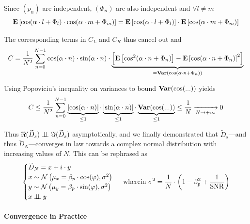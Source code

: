 Since $(p_n)$ are independent, $(\Phi_n)$ are also independent and $\forall l \neq m$
\begin{equation}
	\mathbf{E} \left[\cos(\alpha \cdot l + \Phi_l) \cdot \cos(\alpha \cdot m + \Phi_m) \right] = \mathbf{E} \left[\cos(\alpha \cdot l + \Phi_l)\right] \cdot \mathbf{E} \left[ \cos(\alpha \cdot m + \Phi_m) \right]
\end{equation}

The corresponding terms in $C_L$ and $C_R$ thus cancel out and
\begin{equation}
	\begin{aligned}
		C &= \frac{1}{N^2} \sum_{n=0}^{N-1} \cos (\alpha \cdot n) \cdot \sin (\alpha \cdot n) \cdot \underbrace{ \left[ \mathbf{E} \left[\cos^2 (\alpha \cdot n + \Phi_n)\right] - \mathbf{E} \left[\cos(\alpha \cdot n + \Phi_n)\right]^2 \right] }_{=\mathbf{Var} (\cos (\alpha \cdot n + \Phi_n))}\\
	\end{aligned}
\end{equation}

Using Popoviciu's inequality on variances to bound $\mathbf{Var} (\cos (...))$ yields
\begin{equation}
	C \leq \frac{1}{N^2} \sum_{n=0}^{N-1} \underbrace{\left|\cos (\alpha \cdot n)\right|}_{\leq 1} \cdot \underbrace{\left|\sin (\alpha \cdot n)\right|}_{\leq 1} \cdot \underbrace{\mathbf{Var} (\cos (...))}_{\leq 1} \leq \frac{1}{N} \xrightarrow[N \rightarrow + \infty]{} 0
\end{equation}

Thus $\Re(\widetilde{D}_s) \mathrel{\perp\!\!\!\perp} \Im(\widetilde{D}_s)$ asymptotically, and we finally demonstrated that $\widetilde{D}_s$---and thus $\widetilde{D}_N$---converges in law towards a complex normal distribution with increasing values of $N$. This can be rephrased as
\begin{equation}\label{eq:choos:apsipa:xy_tilde_def}
	\begin{cases}
		\widetilde{D}_N = x + i\cdot y \\
		x \sim \mathcal{N}\left(\mu_x = \beta_p \cdot \cos(\varphi), \sigma^2 \right)\\
		y \sim \mathcal{N}\left(\mu_y = \beta_p \cdot \sin(\varphi), \sigma^2 \right)\\
		x \mathrel{\perp\!\!\!\perp} y
	\end{cases}\text{ wherein } \sigma^2 = \frac{1}{N} \cdot \left(1 - \beta_p^2 + \frac{1}{\text{SNR}}\right)
\end{equation}

\paragraph{Convergence in Practice}\mbox{}\\

